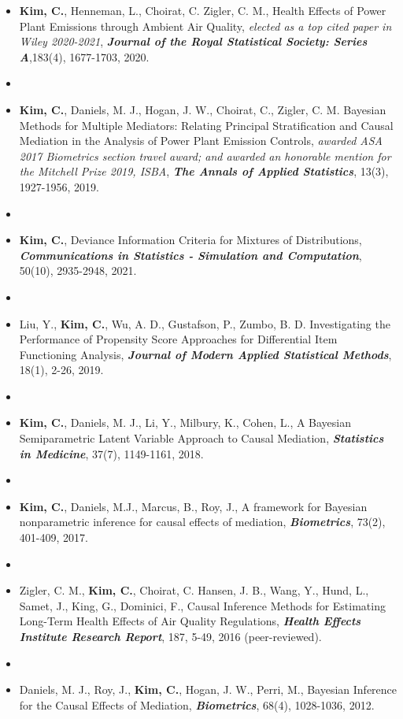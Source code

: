 \documentclass[10pt]{article}
\newenvironment{innerlist}[1][\enskip\textbullet]%
        {\begin{itemize}[#1,leftmargin=*,parsep=0pt,itemsep=0pt,topsep=0pt,partopsep=0pt]}
        {\end{itemize}}
\begin{document}
\begin{innerlist}
     \item[] {\bf Kim, C.}, Henneman, L., Choirat, C. Zigler, C. M., 
Health Effects of Power Plant Emissions through Ambient Air Quality, {\textit{elected as a top cited paper in Wiley 2020-2021},} \textbf {\textit{Journal of the Royal Statistical Society: Series A}},183(4), 1677-1703, 2020.
\item[]
    \item[] {\bf Kim, C.}, Daniels, M. J., Hogan,
      J. W., Choirat, C., Zigler, C. M. 
        Bayesian Methods for Multiple Mediators: Relating Principal Stratification and Causal Mediation in the Analysis of Power Plant Emission Controls, {\textit{awarded ASA 2017 Biometrics section travel award; and awarded an honorable mention for the Mitchell Prize 2019, ISBA}}, \textbf {\textit{The Annals of Applied Statistics}}, 13(3), 1927-1956, 2019.
 \item[]
          \item[] {\bf Kim, C.}, 
        Deviance Information Criteria for Mixtures of Distributions, {\textbf{\textit{Communications in Statistics - Simulation and Computation}}}, 50(10), 2935-2948, 2021.
        \item[]
        \item[] Liu, Y., {\bf Kim, C.}, Wu, A. D., Gustafson, P., Zumbo, B. D.  Investigating the Performance of Propensity Score Approaches for Differential Item Functioning Analysis, \textbf {\textit{Journal of
Modern Applied Statistical Methods}}, 18(1), 2-26, 2019. 
        \item[]
    \item[]{\bf Kim, C.}, Daniels, M. J., Li, Y., Milbury, K., Cohen, L.,
A Bayesian Semiparametric Latent Variable Approach to Causal Mediation, \textbf {\textit{Statistics in Medicine}}, 37(7), 1149-1161, 2018. 
\item[]
    \item[] {\bf Kim, C.}, Daniels, M.J., Marcus, B., Roy, J., 
        A framework for Bayesian nonparametric inference for causal effects of mediation, \textbf {\textit{ Biometrics}}, 73(2), 401-409, 2017.
\item[]
  \item[] Zigler, C. M., {\bf Kim, C.}, Choirat, C. Hansen, J. B., Wang, Y., Hund, L., Samet, J., King, G., Dominici, F., Causal Inference Methods for Estimating Long-Term Health Effects of Air Quality Regulations, \textbf {\textit{Health Effects Institute Research Report}}, 187, 5-49, 2016 (peer-reviewed).
\item[]
  \item[] Daniels, M. J., Roy, J., {\bf Kim, C.}, Hogan, J. W., Perri, M.,
    Bayesian Inference for the Causal Effects of Mediation,
    \textbf {\textit{ Biometrics}}, 68(4), 1028-1036, 2012. 
\end{innerlist}
\end{document}
